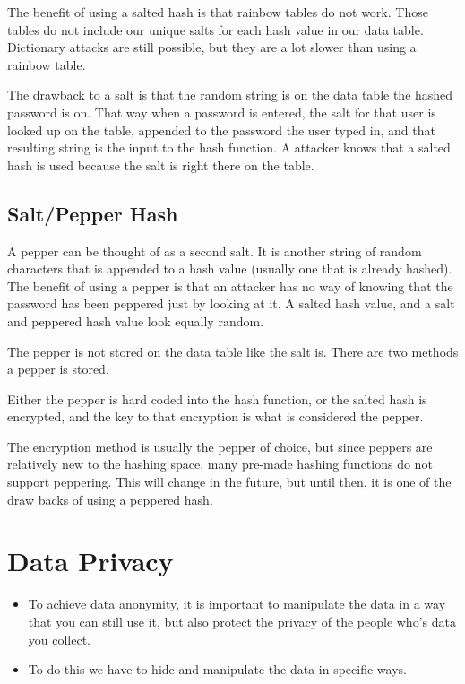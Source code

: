 \documentclass[12pt]{article}
\begin{document}
The benefit of using a salted hash is that rainbow tables do not work. Those tables do not include our unique salts for each hash value in our data table. Dictionary attacks are still possible, but they are a lot slower than using a rainbow table. 

The drawback to a salt is that the random string is on the data table the hashed password is on. That way when a password is entered, the salt for that user is looked up on the table, appended to the password the user typed in, and that resulting string is the input to the hash function. A attacker knows that a salted hash is used because the salt is right there on the table. 

\subsection{Salt/Pepper Hash}
A pepper can be thought of as a second salt. It is another string of random characters that is appended to a hash value (usually one that is already hashed). The benefit of using a pepper is that an attacker has no way of knowing that the password has been peppered just by looking at it. A salted hash value, and a salt and peppered hash value look equally random. 

The pepper is not stored on the data table like the salt is. There are two methods a pepper is stored. 

Either the pepper is hard coded into the hash function, or the salted hash is encrypted, and the key to that encryption is what is considered the pepper. 

The encryption method is usually the pepper of choice, but since peppers are relatively new to the hashing space, many pre-made hashing functions do not support peppering. This will change in the future, but until then, it is one of the draw backs of using a peppered hash. 

\endadjustwidth

\section{Data Privacy}
\begin{itemize}
    \item To achieve data anonymity, it is important to manipulate the data in a way that you can still use it, but also protect the privacy of the people who's data you collect.
    \item To do this we have to hide and manipulate the data in specific ways.
\end{itemize}
\end{document}
